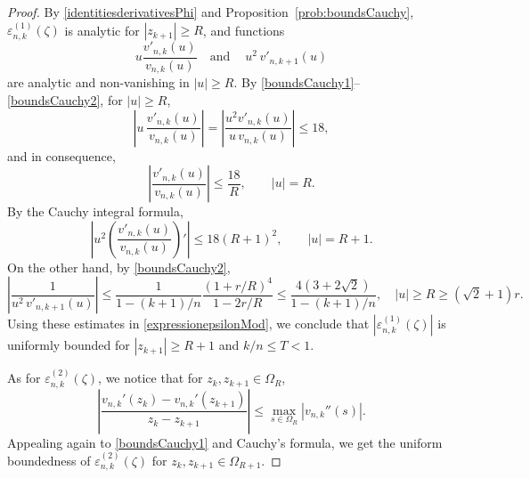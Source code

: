 \documentclass[reqno,11pt]{amsart}
\theoremstyle{plain}
\theoremstyle{definition}
\theoremstyle{remark}
\numberwithin{equation}{section}
\numberwithin{equation}{section}
\begin{document}
\begin{proof}
By \eqref{identitiesderivativesPhi} and Proposition~\ref{prob:boundsCauchy}, $\varepsilon_{n,k}^{(1)}(\zeta)$ is analytic for $|z_{k+1}|\ge R$, and functions
$$
u\frac{ v'_{n,k}(u)}{  v_{n,k}(u)} \quad \text{and} \quad \ u^2\,   v'_{n,k+1}(u) 
$$
are analytic and non-vanishing in $|u|\ge R$. By \eqref{boundsCauchy1}--\eqref{boundsCauchy2}, for $|u|\ge R$,
$$
 \left| u\, \frac{ v'_{n,k}(u)}{  v_{n,k}(u)} \right|= \left|  \frac{u^2    v'_{n,k}(u)}{ u\,  v_{n,k}(u)} \right|\le 18,
$$
and in consequence,
$$
\left| \frac{  v'_{n,k}(u)}{  v_{n,k}(u)} \right|\le \frac{18}{R},  \qquad |u|=R.
$$
By the Cauchy integral formula,
\begin{equation}
    \label{estimate1onPhi}
\left| u^2  \left( \frac{ v'_{n,k}(u)}{  v_{n,k}(u)} \right)'\right|\le 18 (R+1)^2,  \qquad |u|=R+1.
\end{equation}
On the other hand, by \eqref{boundsCauchy2},
\begin{equation}
    \label{boundPhi}
\left| \frac{1}{ u^2\,    v'_{n, k+1}(u) } \right| \le \frac{1}{1-(k+1)/n}\frac{(1+r/R)^4}{1-2r/R}\le \frac{4(3+2 \sqrt{2})}{1-(k+1)/n}, \quad |u|\ge R\ge (\sqrt{2}+1)r. 
\end{equation}
Using these estimates in \eqref{expressionepsilonMod}, we conclude that $\left| \varepsilon_{n,k}^{(1)}(\zeta)\right|$ is uniformly bounded for $|z_{k+1}|\ge R+1$ and $k/n\le T<1$. 

As for $\varepsilon_{n,k}^{(2)} (\zeta)$, we notice that for $z_k, z_{k+1}\in \Omega_R$,
$$
\left|  \frac{ v_{n, k}' \left( z_k \right)- v_{n,k}'\left( z_{k+1} \right)}{    z_k-z_{k+1} }\right|  \leq \max_{s\in \Omega_R} \left| v_{n,k}''\left( s \right)\right| .
$$
Appealing again to \eqref{boundsCauchy1} and Cauchy's formula, we get the uniform boundedness of $\varepsilon_{n,k}^{(2)} (\zeta)$ for  $z_k, z_{k+1}\in \Omega_{R+1}$.


\end{proof}
\end{document}
